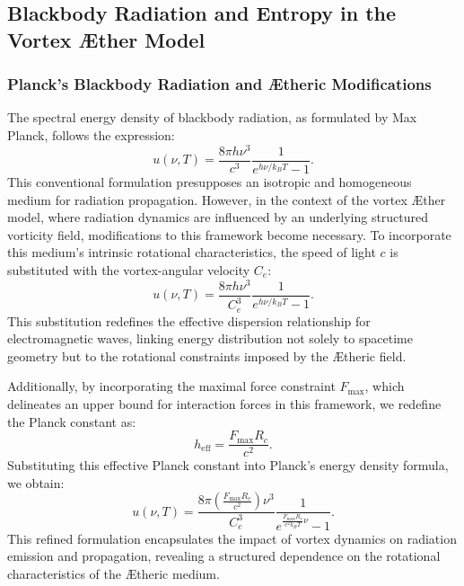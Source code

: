 
\subsection{Blackbody Radiation and Entropy in the Vortex \AE{}ther Model}


\subsubsection*{Planck's Blackbody Radiation and \AE{}theric Modifications}
The spectral energy density of blackbody radiation, as formulated by Max Planck, follows the expression:
\begin{equation*}
u(\nu, T) = \frac{8 \pi h \nu^3}{c^3} \frac{1}{e^{h \nu / k_B T} - 1}.
\end{equation*}
This conventional formulation presupposes an isotropic and homogeneous medium for radiation propagation. However, in the context of the vortex \AE{}ther model, where radiation dynamics are influenced by an underlying structured vorticity field, modifications to this framework become necessary. To incorporate this medium’s intrinsic rotational characteristics, the speed of light $c$ is substituted with the vortex-angular velocity $C_e$:
\begin{equation*}
u(\nu, T) = \frac{8 \pi h \nu^3}{C_e^3} \frac{1}{e^{h \nu / k_B T} - 1}.
\end{equation*}
This substitution redefines the effective dispersion relationship for electromagnetic waves, linking energy distribution not solely to spacetime geometry but to the rotational constraints imposed by the \AE{}theric field.


Additionally, by incorporating the maximal force constraint $F_{\text{max}}$, which delineates an upper bound for interaction forces in this framework, we redefine the Planck constant as:
\begin{equation*}
h_{\text{eff}} = \frac{F_{\text{max}} R_c}{c^2}.
\end{equation*}
Substituting this effective Planck constant into Planck’s energy density formula, we obtain:
\begin{equation*}
u(\nu, T) = \frac{8 \pi \left( \frac{F_{\text{max}} R_c}{c^2} \right) \nu^3}{C_e^3} \frac{1}{e^{\frac{F_{\text{max}} R_c}{c^2 k_B T} \nu} - 1}.
\end{equation*}
This refined formulation encapsulates the impact of vortex dynamics on radiation emission and propagation, revealing a structured dependence on the rotational characteristics of the \AE{}theric medium.


